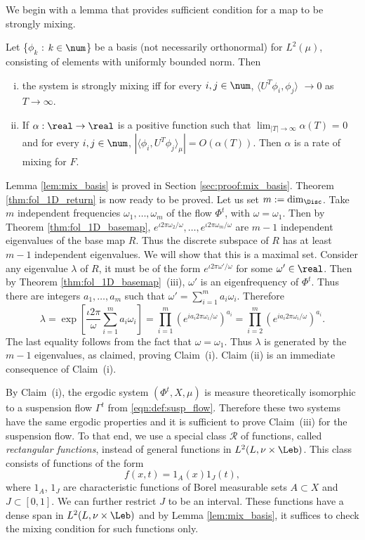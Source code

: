 \documentclass[12pt,oneside]{article}
\newcommand{\MesL}{\nu}
\newcommand{\Rect}{\mathcal{R}}
\newcommand{\Return}{R}
\newcommand{\Susp}{\Gamma}
\begin{document}
We begin with a lemma that provides sufficient condition for a map to be strongly mixing.

\begin{lemma}\label{lem:mix_basis}
Let \{$\phi_k$ : $k\in\num$\} be a basis (not necessarily orthonormal) for $L^2(\mu)$, consisting of elements with uniformly bounded norm. Then 
\begin{enumerate} [(i)]
    \item the system is strongly  mixing iff for every $i,j\in\num$, $\langle U^T \phi_i, \phi_j \rangle$ $\to 0$ as $T\to\infty$. 
    \item If $\alpha:\real \to \real$ is a positive function such that $\lim_{|T|\to\infty} \alpha(T)$ = $0$ and for every $i,j\in\num$, $\left| \langle \phi_i, U^T \phi_j \rangle_\mu \right| = O(\alpha(T))$. Then $\alpha$ is a rate of mixing for $F$.
\end{enumerate}
\end{lemma}

Lemma \ref{lem:mix_basis} is proved in Section \ref{sec:proof:mix_basis}. Theorem \ref{thm:fol_1D_return} is now ready to be proved. Let us set $m := \dim_{\Disc}$. Take $m$ independent frequencies $\omega_1,\ldots,\omega_m$  of the flow $\Phi^t$, with $\omega=\omega_1$. Then by  Theorem \ref{thm:fol_1D_basemap}, $e^{\iota 2\pi \omega_2/\omega}, \ldots, e^{\iota 2\pi \omega_m/\omega}$ are $m-1$ independent eigenvalues of the base map $\Return$. Thus the discrete subspace of $\Return$ has at least $m-1$ independent eigenvalues. We will show that this is a maximal set. Consider any eigenvalue $\lambda$ of $\Return$, it must be of the form $e^{\iota 2\pi \omega'/\omega}$ for some $\omega'\in\real$. Then by Theorem \ref{thm:fol_1D_basemap}~(iii), $\omega'$ is an eigenfrequency of $\Phi^t$. Thus there are integers $a_1, \ldots, a_m$ such that $\omega' = \sum_{i=1}^{m} a_i \omega_i$. Therefore
%
\[ \lambda = \exp\left[ \frac{\iota 2\pi}{\omega} \sum_{i=1}^{m} a_i \omega_i \right] = \prod_{i=1}^{m} \left( e^{i a_i 2\pi\omega_i/\omega} \right)^{a_i}  = \prod_{i=2}^{m} \left( e^{i a_i 2\pi\omega_i/\omega} \right)^{a_i}. \]
%
The last equality follows from the fact that $\omega=\omega_1$. Thus $\lambda$ is generated by the $m-1$ eigenvalues, as claimed, proving Claim~(i). Claim (ii) is an immediate consequence of Claim~(i). 

By Claim~(i), the ergodic system $(\Phi^t,X,\mu)$ is measure theoretically isomorphic to a suspension flow $\Susp^t$ from \eqref{eqn:def:susp_flow}. Therefore these two systems have the same ergodic properties and it is sufficient to prove Claim~(iii) for the suspension flow. To that end, we use a special class $\Rect$ of functions, called \emph{rectangular functions}, instead of general functions in $L^2(L,\MesL\times \Leb)$. This class consists of functions of the form 
%
\[f(x,t) = 1_A(x)1_J(t),\]
%
where $1_A$, $1_J$ are characteristic functions of Borel measurable sets $A\subset X$ and $J\subset [0,1]$. We can further restrict $J$ to be an interval. These functions have a dense span in $L^2(L,\MesL\times \Leb)$ and by Lemma \ref{lem:mix_basis}, it suffices to check the mixing condition for such functions only. 
\end{document}
